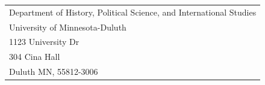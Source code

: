 \documentclass[11pt]{article}
\begin{document}

\begin{tabular}{@{}l@{}}
Department of History, Political Science, and International Studies \\
 University of Minnesota-Duluth \\
1123 University Dr \\
304 Cina Hall \\
Duluth MN, 55812-3006
\end{tabular}



\end{document}
